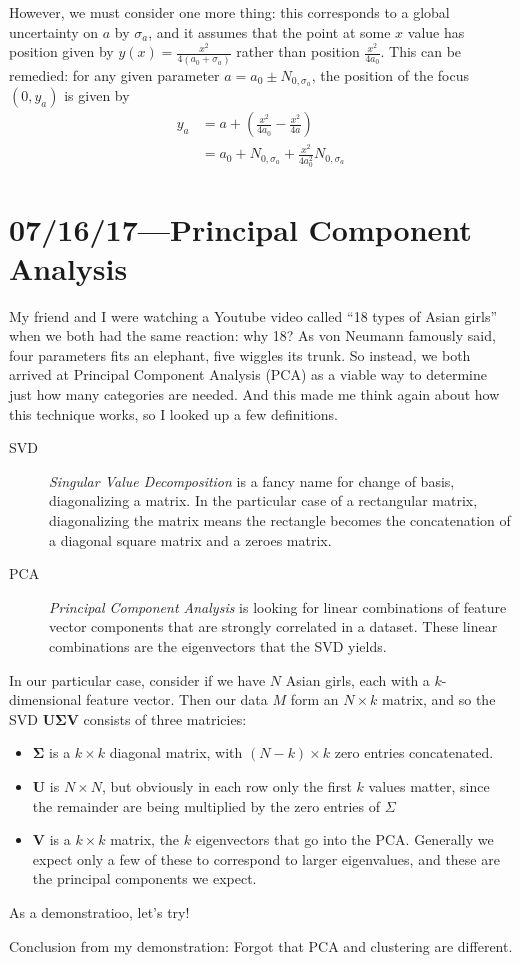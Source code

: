 \documentclass[12pt]{report}
\newcommand{\bm}[1]{\boldsymbol{\mathbf{#1}}}
\begin{document}
However, we must consider one more thing: this corresponds to a global
uncertainty on $a$ by $\sigma_a$, and it assumes that the point at some $x$
value has position given by $y(x) = \frac{x^2}{4 (a_0 + \sigma_a)}$ rather than
position $\frac{x^2}{4 a_0}$. This can be remedied: for any given parameter $a =
a_0 \pm N_{0, \sigma_a}$, the position of the focus $(0, y_a)$ is given by
\begin{align*}
    y_a
        &= a + \left(\frac{x^2}{4a_0} - \frac{x^2}{4 a}\right)\\
        &= a_0 + N_{0, \sigma_a} + \frac{x^2}{4a_0^2}N_{0, \sigma_a}
\end{align*}

\chapter{07/16/17---Principal Component Analysis}

My friend and I were watching a Youtube video called ``18 types of Asian girls''
when we both had the same reaction: why 18? As von Neumann famously said, four
parameters fits an elephant, five wiggles its trunk. So instead, we both arrived
at Principal Component Analysis (PCA) as a viable way to determine just how many
categories are needed. And this made me think again about how this technique
works, so I looked up a few definitions.

\begin{description}
    \item[SVD] \emph{Singular Value Decomposition} is a fancy name for
        change of basis, diagonalizing a matrix. In the particular case of a
        rectangular matrix, diagonalizing the matrix means the rectangle becomes
        the concatenation of a diagonal square matrix and a zeroes matrix.

    \item[PCA] \emph{Principal Component Analysis} is looking for linear
        combinations of feature vector components that are strongly correlated
        in a dataset. These linear combinations are the eigenvectors that the
        SVD yields.
\end{description}

In our particular case, consider if we have $N$ Asian girls, each with a
$k$-dimensional feature vector. Then our data $M$ form an $N \times k$ matrix, and
so the SVD $\bm{U\Sigma V}$ consists of three matricies:
\begin{itemize}
    \item $\bm{\Sigma}$ is a $k \times k$ diagonal matrix, with $(N - k) \times
        k$ zero entries concatenated.
    \item $\bm{U}$ is $N \times N$, but obviously in each row only the first $k$
        values matter, since the remainder are being multiplied by the zero
        entries of $\Sigma$
    \item $\bm{V}$ is a $k \times k$ matrix, the $k$ eigenvectors that go into
        the PCA\@. Generally we expect only a few of these to correspond to larger
        eigenvalues, and these are the principal components we expect.
\end{itemize}

As a demonstratioo, let's try!

Conclusion from my demonstration: Forgot that PCA and clustering are different.
\end{document}
